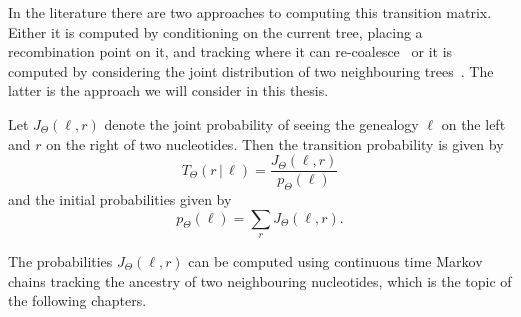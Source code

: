 In the literature there are two approaches to computing this transition matrix. Either it is computed by conditioning on the current tree, placing a recombination point on it, and tracking where it can re-coalesce~\cite{Hobolth:2014cw,Li:2011ez} or it is computed by considering the joint distribution of two neighbouring trees~\cite{Dutheil:2009dt,Mailund:2011dv}. The latter is the approach we will consider in this thesis.

Let $J_\Theta(\ell,r)$ denote the joint probability of seeing the genealogy $\ell$ on the left and $r$ on the right of two nucleotides. Then the transition probability is given by
\[
    T_\Theta(r \,|\, \ell) = \frac{J_\Theta(\ell,r)}{p_\Theta(\ell)}
\]
and the initial probabilities given by
\[
    p_\Theta(\ell) = \sum_{r} J_\Theta(\ell, r)
    .
\]

The probabilities $J_\Theta(\ell,r)$ can be computed using continuous time Markov chains tracking the ancestry of two neighbouring nucleotides, which is the topic of the following chapters.
